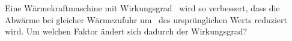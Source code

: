 Eine Wärmekraftmaschine mit Wirkungsgrad \etAO\ wird so verbessert, dass die Abwärme bei gleicher Wärmezufuhr um \rabO\ des ursprünglichen Werts reduziert wird. Um welchen Faktor ändert sich dadurch der Wirkungsgrad?
